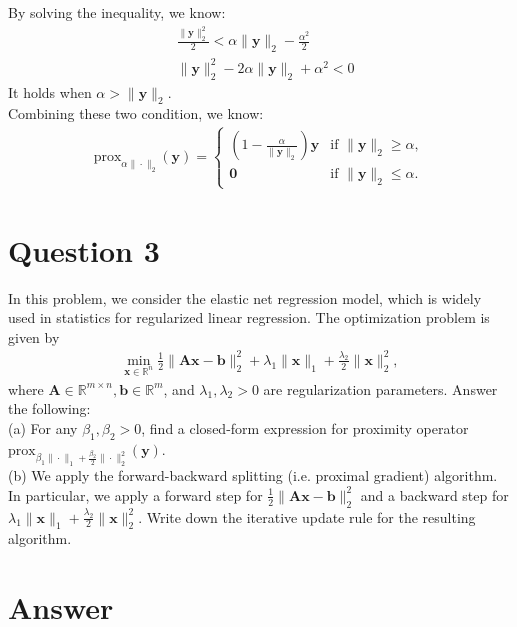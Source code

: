 \documentclass{article}
\newcommand{\R}{\mathbb{R}}
\begin{document}
By solving the inequality, we know:
\begin{align*}
    &\frac{\|\bm{y}\|_2^2}{2} <  \alpha\|\bm{y}\|_2 - \frac{\alpha^2}{2} \\
    &\|\bm{y}\|_2^2 - 2\alpha\|\bm{y}\|_2 + \alpha^2 < 0
\end{align*}
It holds when \(\alpha > \|\bm{y}\|_2\).  \\
Combining these two condition, we know:
\begin{align*}
    \text{prox}_{\alpha \|\cdot\|_2}(\bm{y}) = \begin{cases}
        \left(1 - \frac{\alpha}{\|\bm{y}\|_2} \right)\bm{y} &\text{if }\|\bm{y}\|_2 \geq \alpha, \\
        \bm{0} &\text{if } \|\bm{y}\|_2 \leq \alpha.
    \end{cases}
\end{align*}








\section*{Question 3}
In this problem, we consider the elastic net regression model, which is widely used in statistics for regularized linear regression. The optimization problem is given by
\begin{align*}
    \min_{\bm{x}\in\R^n} \frac{1}{2} \|\bm{A}\bm{x} - \bm{b}\|_2^2 + \lambda_1\|\bm{x}\|_1 + \frac{\lambda_2}{2}\|\bm{x}\|_2^2,
\end{align*}
where \(\bm{A} \in \R^{m \times n}, \bm{b} \in \R^m\), and \(\lambda_1, \lambda_2 > 0\) are regularization parameters. Answer the following: \\
(a) For any \(\beta_1, \beta_2 > 0\), find a closed-form expression for proximity operator \(\text{prox}_{\beta_1\|\cdot\|_1 + \frac{\beta_2}{2}\|\cdot\|_2^2}(\bm{y})\). \\
(b) We apply the forward-backward splitting (i.e. proximal gradient) algorithm. In particular, we apply a forward step for \(\frac{1}{2} \|\bm{A}\bm{x} - \bm{b}\|_2^2\) and a backward step for \(\lambda_1\|\bm{x}\|_1 + \frac{\lambda_2}{2}\|\bm{x}\|_2^2\). Write down the iterative update rule for the resulting algorithm.


\section*{Answer}
\end{document}
